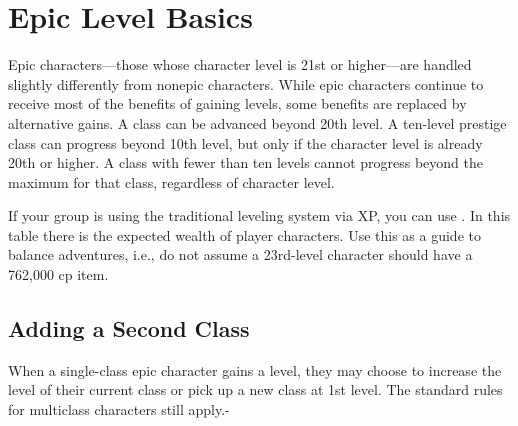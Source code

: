 \section{Epic Level Basics}
Epic characters---those whose character level is 21st or higher---are handled slightly differently from nonepic characters. While epic characters continue to receive most of the benefits of gaining levels, some benefits are replaced by alternative gains. A class can be advanced beyond 20th level. A ten-level prestige class can progress beyond 10th level, but only if the character level is already 20th or higher. A class with fewer than ten levels cannot progress beyond the maximum for that class, regardless of character level.

If your group is using the traditional leveling system via XP, you can use . In this table there is the expected wealth of player characters. Use this as a guide to balance adventures, i.e., do not assume a 23rd-level character should have a 762,000 cp item.






\subsection{Adding a Second Class}
When a single-class epic character gains a level, they may choose to increase the level of their current class or pick up a new class at 1st level. The standard rules for multiclass characters still apply.-

